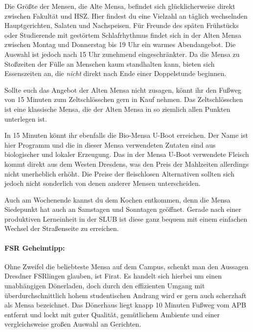 Die Größte der Mensen, die Alte Mensa, befindet sich glücklicherweise direkt zwischen Fakultät und HSZ\@.
Hier findest du eine Vielzahl an täglich wechselnden Hauptgerichten, Salaten und Nachspeisen.
Für Freunde des späten Frühstücks oder Studierende mit gestörtem Schlafrhythmus findet sich in der Alten Mensa zwischen Montag und Donnerstag bis 19 Uhr ein warmes Abendangebot.
Die Auswahl ist jedoch nach 15 Uhr zunehmend eingeschränkter.
Da die Mensa zu Stoßzeiten der Fülle an Menschen kaum standhalten kann, bieten sich Essenszeiten an, die \emph{nicht} direkt nach Ende einer Doppelstunde beginnen.

Sollte euch das Angebot der Alten Mensa nicht zusagen, könnt ihr den Fußweg von 15 Minuten zum Zeltschlösschen gern in Kauf nehmen. Das Zeltschlösschen ist eine klassische Mensa, die der Alten Mensa in so ziemlich allen Punkten unterlegen ist.

In 15 Minuten könnt ihr ebenfalls die Bio-Mensa U-Boot erreichen. Der Name ist hier Programm und die in dieser Mensa verwendeten Zutaten sind aus biologischer und lokaler Erzeugung.
Das in der Mensa U-Boot verwendete Fleisch kommt direkt aus dem Westen Dresdens, was den Preis der Mahlzeiten allerdings nicht unerheblich erhöht.
Die Preise der fleischlosen Alternativen sollten sich jedoch nicht sonderlich von denen anderer Mensen unterscheiden.

Auch am Wochenende kannst du dem Kochen entkommen, denn die Mensa Siedepunkt hat auch an Samstagen und Sonntagen geöffnet.
Gerade nach einer produktiven Lerneinheit in der SLUB ist diese ganz bequem mit einem einfachen Wechsel der Straßenseite zu erreichen.

\paragraph{FSR Geheimtipp:}
Ohne Zweifel die beliebteste Mensa auf dem Campus, schenkt man den Aussagen Dresdner FSRlingen glauben, ist Firat.
Es handelt sich hierbei um einen unabhängigen Dönerladen, doch durch den effizienten Umgang mit überdurchschnittlich hohem studentischen Andrang wird er gern auch scherzhaft als Mensa bezeichnet.
Das Dönerhaus liegt knapp 10 Minuten Fußweg vom APB entfernt und lockt mit guter Qualität, gemütlichem Ambiente und einer vergleichsweise großen Auswahl an Gerichten.


